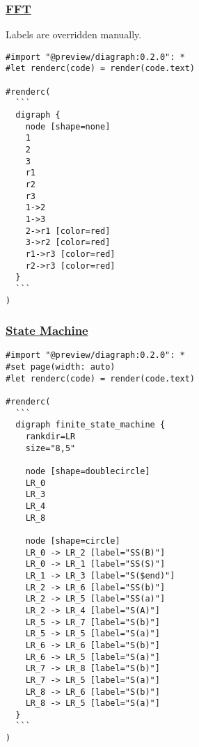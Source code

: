 \pandocbounded{}

\subsubsection{\texorpdfstring{\hyperref[fft]{FFT}}{FFT}}\label{fft}

Labels are overridden manually.

\begin{verbatim}
#import "@preview/diagraph:0.2.0": *
#let renderc(code) = render(code.text)

#renderc(
  ```
  digraph {
    node [shape=none]
    1
    2
    3
    r1
    r2
    r3
    1->2
    1->3
    2->r1 [color=red]
    3->r2 [color=red]
    r1->r3 [color=red]
    r2->r3 [color=red]
  }
  ```
)
\end{verbatim}

\pandocbounded{}

\subsubsection{\texorpdfstring{\hyperref[state-machine]{State
Machine}}{State Machine}}\label{state-machine}

\begin{verbatim}
#import "@preview/diagraph:0.2.0": *
#set page(width: auto)
#let renderc(code) = render(code.text)

#renderc(
  ```
  digraph finite_state_machine {
    rankdir=LR
    size="8,5"

    node [shape=doublecircle]
    LR_0
    LR_3
    LR_4
    LR_8

    node [shape=circle]
    LR_0 -> LR_2 [label="SS(B)"]
    LR_0 -> LR_1 [label="SS(S)"]
    LR_1 -> LR_3 [label="S($end)"]
    LR_2 -> LR_6 [label="SS(b)"]
    LR_2 -> LR_5 [label="SS(a)"]
    LR_2 -> LR_4 [label="S(A)"]
    LR_5 -> LR_7 [label="S(b)"]
    LR_5 -> LR_5 [label="S(a)"]
    LR_6 -> LR_6 [label="S(b)"]
    LR_6 -> LR_5 [label="S(a)"]
    LR_7 -> LR_8 [label="S(b)"]
    LR_7 -> LR_5 [label="S(a)"]
    LR_8 -> LR_6 [label="S(b)"]
    LR_8 -> LR_5 [label="S(a)"]
  }
  ```
)
\end{verbatim}

\pandocbounded{}


